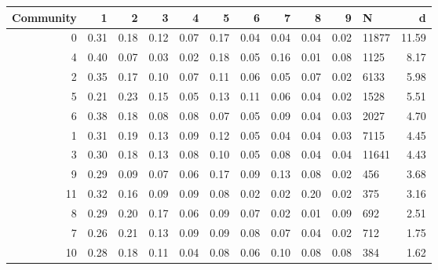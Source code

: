 \begin{tabular}{rrrrrrrrrrlr}
\toprule
 Community &    1 &    2 &    3 &    4 &    5 &    6 &    7 &    8 &    9 &      N &     d \\
\midrule
         0 & 0.31 & 0.18 & 0.12 & 0.07 & 0.17 & 0.04 & 0.04 & 0.04 & 0.02 &  11877 & 11.59 \\
         4 & 0.40 & 0.07 & 0.03 & 0.02 & 0.18 & 0.05 & 0.16 & 0.01 & 0.08 &   1125 &  8.17 \\
         2 & 0.35 & 0.17 & 0.10 & 0.07 & 0.11 & 0.06 & 0.05 & 0.07 & 0.02 &   6133 &  5.98 \\
         5 & 0.21 & 0.23 & 0.15 & 0.05 & 0.13 & 0.11 & 0.06 & 0.04 & 0.02 &   1528 &  5.51 \\
         6 & 0.38 & 0.18 & 0.08 & 0.08 & 0.07 & 0.05 & 0.09 & 0.04 & 0.03 &   2027 &  4.70 \\
         1 & 0.31 & 0.19 & 0.13 & 0.09 & 0.12 & 0.05 & 0.04 & 0.04 & 0.03 &   7115 &  4.45 \\
         3 & 0.30 & 0.18 & 0.13 & 0.08 & 0.10 & 0.05 & 0.08 & 0.04 & 0.04 &  11641 &  4.43 \\
         9 & 0.29 & 0.09 & 0.07 & 0.06 & 0.17 & 0.09 & 0.13 & 0.08 & 0.02 &    456 &  3.68 \\
        11 & 0.32 & 0.16 & 0.09 & 0.09 & 0.08 & 0.02 & 0.02 & 0.20 & 0.02 &    375 &  3.16 \\
         8 & 0.29 & 0.20 & 0.17 & 0.06 & 0.09 & 0.07 & 0.02 & 0.01 & 0.09 &    692 &  2.51 \\
         7 & 0.26 & 0.21 & 0.13 & 0.09 & 0.09 & 0.08 & 0.07 & 0.04 & 0.02 &    712 &  1.75 \\
        10 & 0.28 & 0.18 & 0.11 & 0.04 & 0.08 & 0.06 & 0.10 & 0.08 & 0.08 &    384 &  1.62 \\
\bottomrule
\end{tabular}
